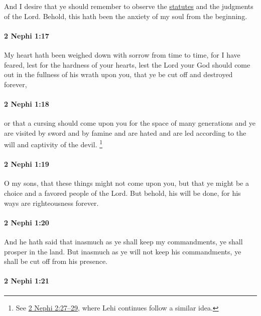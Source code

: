 			And I desire that ye should remember
			to observe the \hyperref[STATUTE]{statutes} and the judgments of the Lord.
			Behold, this hath been the anxiety of my soul from the beginning.

		\paragraph{2 Nephi 1:17} %
			\label{2NEPHI-1-17}

			My heart hath been weighed down with sorrow from time to time,
			for I have feared, lest for the hardness of your hearts,
			lest the Lord your God should come out
			in the fullness of his wrath upon you,
			that ye be cut off and destroyed forever,

		\paragraph{2 Nephi 1:18} %
			\label{2NEPHI-1-18}

			or that a cursing should come upon you for the space of many generations
			and ye are visited by sword and by famine and are hated
			and are led according to the will and captivity of the devil.%
				\footnote{%
					\label{2NEPHI-1-18-captivity}%
					See \hyperref[2NEPHI-2-27]{2 Nephi 2:27--29}, where Lehi continues follow a similar idea.
					}

		\paragraph{2 Nephi 1:19} %
			\label{2NEPHI-1-19}

			O my sons, that these things might not come upon you,
			but that ye might be a choice and a favored people of the Lord.
			But behold, his will be done,
			for his ways are righteousness forever.

		\paragraph{2 Nephi 1:20} %
			\label{2NEPHI-1-20}

			And he hath said that
			inasmuch as ye shall keep my commandments,
			ye shall prosper in the land.
			But inasmuch as ye will not keep his commandments,
			ye shall be cut off from his presence.

		\paragraph{2 Nephi 1:21} %
			\label{2NEPHI-1-21}

